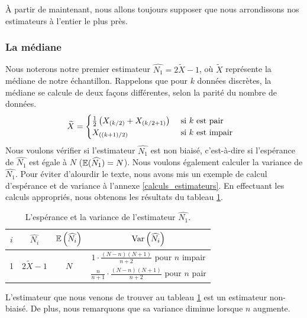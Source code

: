 \documentclass[10pt]{article}
\begin{document}
À partir de maintenant, nous allons toujours supposer que nous
arrondissons nos estimateurs à l'entier le plus près.

\hypertarget{la-mediane}{%
\subsubsection{La médiane}\label{la-mediane}}

Nous noterons notre premier estimateur
\(\widehat{N_1}=2\widetilde{X}-1\), où \(\widetilde{X}\) représente la
médiane de notre échantillon. Rappelons que pour \(k\) données
discrètes, la médiane se calcule de deux façons différentes, selon la
parité du nombre de données. \begin{align*}
\widetilde{X} &= 
\begin{cases}
\frac{1}{2}\left(X_{\left(k/2\right)}+X_{\left(k/2+1\right)}\right) & \text{ si $k$ est pair} \\
X_{\left((k+1)/2\right)} & \text{ si $k$ est impair} \\
\end{cases}
\end{align*} Nous voulons vérifier si l'estimateur \(\widehat{N_1}\) est
non biaisé, c'est-à-dire si l'espérance de \(\widehat{N_1}\) est égale à
\(N\) (\(\operatorname{\mathbb{E}} (\widehat{N_1})=N\)). Nous voulons également calculer la
variance de \(\widehat{N_1}\). Pour éviter d'alourdir le texte, nous
avons mis un exemple de calcul d'espérance et de variance à l'annexe
\ref{calculs_estimateurs}. En effectuant les calculs appropriés, nous
obtenons les résultats du tableau \ref{tab:estimateur_n1}.

\begin{table}[ht]
\begin{center}
\begin{tabular}{cccc}
\toprule
$i$ & $\widehat{N_i}$ & $\operatorname{\mathbb{E}}\left(\widehat{N_i}\right)$ & $\operatorname{Var}\left(\widehat{N_i}\right)$ \\
\midrule
\multirow{2}{*}{1}  & \multirow{2}{*}{$2\widetilde{X}-1$} & \multirow{2}{*}{$N$} & 
$1\cdot\frac{(N-n)(N+1)}{n+2}$ pour $n$ impair \\[5pt]
& & & $\frac{n}{n+1}\cdot\frac{(N-n)(N+1)}{n+2}$ pour $n$ pair \\
\bottomrule
\end{tabular}
\end{center}
\caption{\label{tab:estimateur_n1} {L'espérance et la variance de l'estimateur $\widehat{N_1}$.} }
\end{table}

L'estimateur que nous venons de trouver au tableau
\ref{tab:estimateur_n1} est un estimateur non-biaisé. De plus, nous
remarquons que sa variance diminue lorsque \(n\) augmente.
\end{document}
